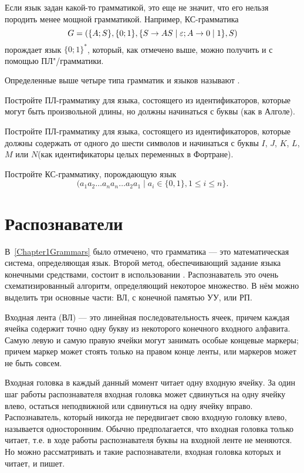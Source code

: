 Если язык задан какой-то грамматикой, это еще не значит, что его нельзя породить менее мощной грамматикой. Например, КС-грамматика
\[
	G=(\{A;S\}, \{0;1\}, \{S\to AS \mid \varepsilon; A \to 0 \mid 1 \}, S)
\]
порождает язык $\{0;1\}^*$, который, как отмечено выше, можно
получить и с помощью ПЛ"/грамматики.

Определенные выше четыре типа грамматик и языков называют
.

\begin{myproblem}
Постройте ПЛ-грамматику для языка, состоящего из идентификаторов, которые могут быть произвольной длины, но должны начинаться с буквы (как в Алголе).
\end{myproblem}

\begin{myproblem}
Постройте ПЛ-грамматику для языка, состоящего из идентификаторов, которые должны содержать от одного до шести символов и начинаться с буквы $I$, $J$, $K$, $L$, $M$ или $N$(как идентификаторы целых переменных в Фортране).
\end{myproblem}
\begin{myproblem}
Постройте КС-грамматику, порождающую язык
\[
	(a_1a_2 \ldots a_na_n \ldots a_2a_1 \mid
    	a_i\in\{0,1\}, 1\le i\le n\}.
\]
\end{myproblem}

\section{Распознаватели}
\label{Chapter1Parsers}

В~\ref{Chapter1Grammars} было отмечено, что грамматика --- это математическая
система, определяющая язык. Второй метод, обеспечивающий
задание языка конечными средствами, состоит в использовании
. Распознаватель это очень схематизированный
алгоритм, определяющий некоторое множество. В нём можно
выделить три основные части:  ВЛ,
 с конечной памятью УУ,  или  РП.

Входная лента (ВЛ) --- это линейная последовательность ячеек,
причем каждая
ячейка содержит точно одну букву из некоторого конечного входного
алфавита. Самую левую и самую правую ячейки могут занимать особые
концевые маркеры; причем маркер может стоять только на правом конце
ленты, или маркеров может не быть совсем.

Входная головка в каждый данный момент читает одну входную ячейку.
За один шаг работы распознавателя входная головка может
сдвинуться на одну
ячейку влево, остаться неподвижной или сдвинуться на одну ячейку
вправо. Распознаватель, который никогда не передвигает свою входную
головку влево, называется  односторонним. Обычно предполагается, что
входная головка только читает, т.е. в ходе работы распознавателя
буквы на входной ленте не меняются. Но можно рассматривать и такие
распознаватели, входная головка которых и читает, и пишет.

